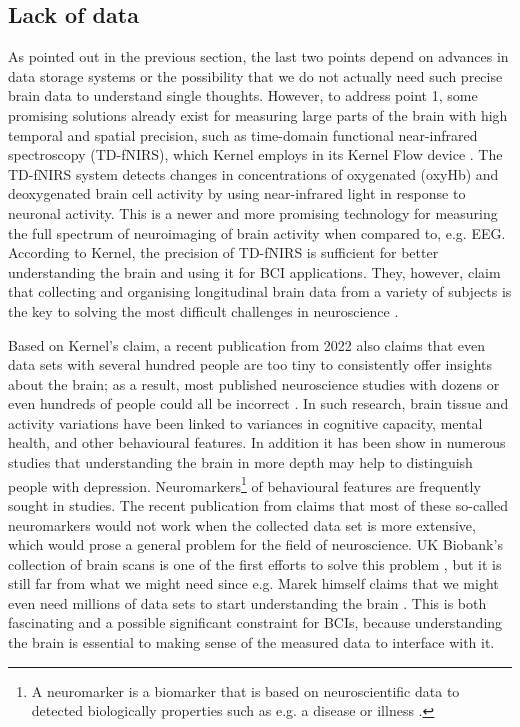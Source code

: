 \subsection{Lack of data}
\label{chapter2-lack-of-data}

As pointed out in the previous section, the last two points depend on advances in data storage systems or the possibility that we do not actually need such precise brain data to understand single thoughts. However, to address point 1, some promising solutions already exist for measuring large parts of the brain with high temporal and spatial precision, such as time-domain functional near-infrared spectroscopy (TD-fNIRS), which Kernel employs in its Kernel Flow device \citep{ban_kernel_2021}. The TD-fNIRS system detects changes in concentrations of oxygenated (oxyHb) and deoxygenated brain cell activity by using near-infrared light in response to neuronal activity. This is a newer and more promising technology for measuring the full spectrum of neuroimaging of brain activity when compared to, e.g. EEG. According to Kernel, the precision of TD-fNIRS is sufficient for better understanding the brain and using it for BCI applications. They, however, claim that collecting and organising longitudinal brain data from a variety of subjects is the key to solving the most difficult challenges in neuroscience \citep{kernel_hello-humanitypdf_nodate}.

\newpage

Based on Kernel's claim, a recent publication from 2022 also claims that even data sets with several hundred people are too tiny to consistently offer insights about the brain; as a result, most published neuroscience studies with dozens or even hundreds of people could all be incorrect \citep{marek_reproducible_2022}. In such research, brain tissue and activity variations have been linked to variances in cognitive capacity, mental health, and other behavioural features. In addition it has been show in numerous studies that understanding the brain in more depth may help to distinguish people with depression. Neuromarkers\footnote{A neuromarker is a biomarker that is based on neuroscientific data to detected biologically properties such as e.g. a disease or illness \citep{jollans_neuromarkers_2018}.} of behavioural features are frequently sought in studies. The recent publication from \citeauthor{marek_reproducible_2022} claims that most of these so-called neuromarkers would not work when the collected data set is more extensive, which would prose a general problem for the field of neuroscience. UK Biobank's collection of brain scans is one of the first efforts to solve this problem \citep{noauthor_imaging_nodate}, but it is still far from what we might need since e.g. Marek himself claims that we might even need millions of data sets to start understanding the brain \citep{callaway_can_2022}. This is both fascinating and a possible significant constraint for BCIs, because understanding the brain is essential to making sense of the measured data to interface with it.

